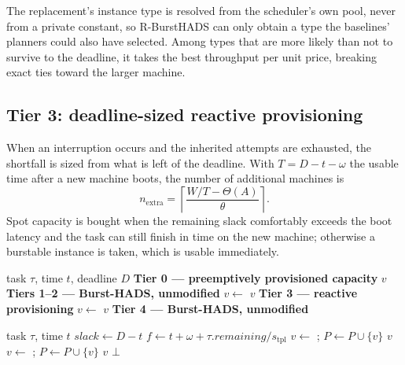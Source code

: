 \documentclass[conference]{IEEEtran}
\begin{document}
The replacement's instance type is resolved from the scheduler's own pool, never
from a private constant, so R-BurstHADS can only obtain a type the baselines'
planners could also have selected. Among types that are more likely than not to
survive to the deadline, it takes the best throughput per unit price, breaking
exact ties toward the larger machine.

\subsection{Tier 3: deadline-sized reactive provisioning}

When an interruption occurs and the inherited attempts are exhausted, the
shortfall is sized from what is left of the deadline. With $T = D - t - \omega$
the usable time after a new machine boots, the number of additional machines is
\begin{equation}
n_{\mathrm{extra}} = \left\lceil \frac{W/T - \Theta(A)}{\theta} \right\rceil .
\label{eq:thm2}
\end{equation}
Spot capacity is bought when the remaining slack comfortably exceeds the boot
latency and the task can still finish in time on the new machine; otherwise a
burstable instance is taken, which is usable immediately.

\begin{algorithm}[!t]
\caption{R-BurstHADS: destination selection on hibernation}
\label{alg:select}
\begin{algorithmic}[1]
\Require task $\tau$, time $t$, deadline $D$
\Statex \textbf{Tier 0 --- preemptively provisioned capacity}
   \Return $v$ \EndIf
\EndFor
\Statex \textbf{Tiers 1--2 --- Burst-HADS, unmodified}
\State $v \gets$ 
 \Return $v$ \EndIf
\Statex \textbf{Tier 3 --- reactive provisioning}
\State $v \gets$ 
 \Return $v$ \EndIf
\Statex \textbf{Tier 4 --- Burst-HADS, unmodified}
\State \Return {}
\end{algorithmic}
\end{algorithm}

\begin{algorithm}[!t]
\caption{\textsc{ProvisionOneMore}}
\label{alg:provision}
\begin{algorithmic}[1]
\Require task $\tau$, time $t$
\State $\mathit{slack} \gets D - t$
  \State $f \gets t + \omega + \tau.\mathit{remaining}/s_{\mathrm{tpl}}$
    \State $v \gets$ ;
           $P \gets P \cup \{v\}$
    \State \Return $v$
  \EndIf
\EndIf
{}
  \State $v \gets$ ;
         $P \gets P \cup \{v\}$
  \State \Return $v$
\EndIf
\State \Return $\bot$
\end{algorithmic}
\end{algorithm}
\end{document}
